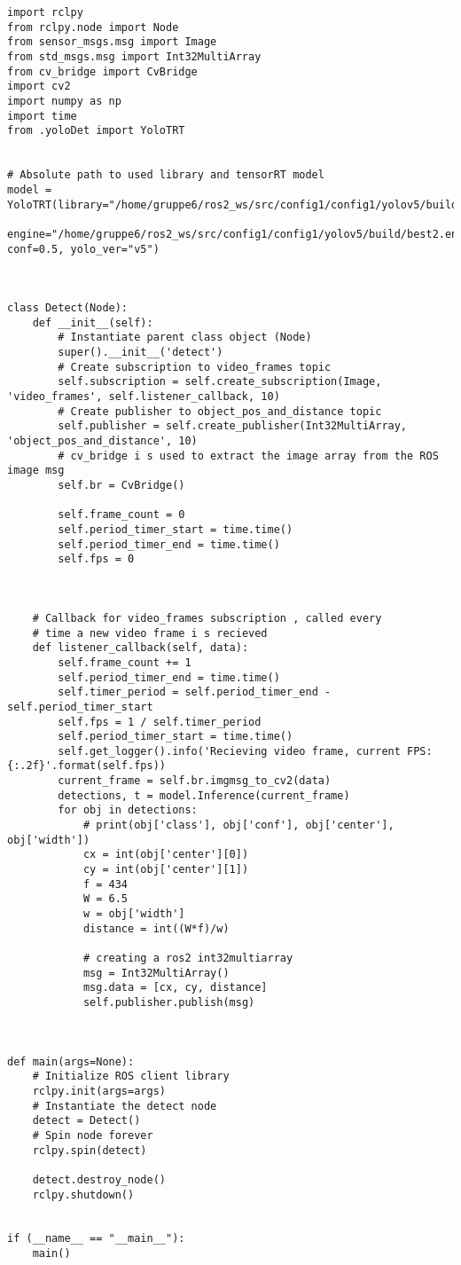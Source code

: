 \begin{lstlisting}[language=PythonPlus, basicstyle=\tiny,]
import rclpy
from rclpy.node import Node
from sensor_msgs.msg import Image
from std_msgs.msg import Int32MultiArray
from cv_bridge import CvBridge
import cv2
import numpy as np
import time
from .yoloDet import YoloTRT


# Absolute path to used library and tensorRT model
model = YoloTRT(library="/home/gruppe6/ros2_ws/src/config1/config1/yolov5/build/libmyplugins.so", 
                engine="/home/gruppe6/ros2_ws/src/config1/config1/yolov5/build/best2.engine", conf=0.5, yolo_ver="v5")



class Detect(Node):
    def __init__(self):
        # Instantiate parent class object (Node)
        super().__init__('detect')
        # Create subscription to video_frames topic
        self.subscription = self.create_subscription(Image, 'video_frames', self.listener_callback, 10)
        # Create publisher to object_pos_and_distance topic
        self.publisher = self.create_publisher(Int32MultiArray, 'object_pos_and_distance', 10)
        # cv_bridge i s used to extract the image array from the ROS image msg
        self.br = CvBridge()

        self.frame_count = 0
        self.period_timer_start = time.time()
        self.period_timer_end = time.time()
        self.fps = 0
        

        
    # Callback for video_frames subscription , called every
    # time a new video frame i s recieved
    def listener_callback(self, data):
        self.frame_count += 1
        self.period_timer_end = time.time()
        self.timer_period = self.period_timer_end - self.period_timer_start
        self.fps = 1 / self.timer_period
        self.period_timer_start = time.time()
        self.get_logger().info('Recieving video frame, current FPS: {:.2f}'.format(self.fps))
        current_frame = self.br.imgmsg_to_cv2(data)
        detections, t = model.Inference(current_frame)
        for obj in detections:
            # print(obj['class'], obj['conf'], obj['center'], obj['width'])
            cx = int(obj['center'][0])
            cy = int(obj['center'][1])
            f = 434
            W = 6.5
            w = obj['width']
            distance = int((W*f)/w)
            
            # creating a ros2 int32multiarray
            msg = Int32MultiArray()
            msg.data = [cx, cy, distance]
            self.publisher.publish(msg)



def main(args=None):
    # Initialize ROS client library
    rclpy.init(args=args)
    # Instantiate the detect node
    detect = Detect()
    # Spin node forever
    rclpy.spin(detect)
    
    detect.destroy_node()
    rclpy.shutdown()
        

if (__name__ == "__main__"):
    main()

\end{lstlisting}


